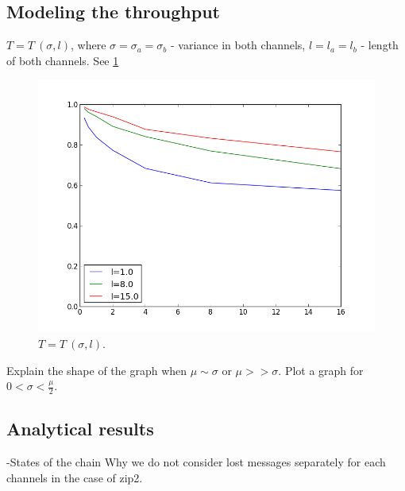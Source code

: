   \subsection{Modeling the throughput}
$T = T \: (\sigma, l)$, where $\sigma = \sigma_{a} = \sigma_{b}$ - variance in both channels, $l = l_{a} = l_{b}$ - length of both channels. See \ref{fig:t_s}
    \begin{figure}[here]
    \centering
    \includegraphics[scale=0.4]{figs/thr_(disp,l).png}
    \caption{$T = T \: (\sigma, l)$.}
    \label{fig:t_s}
    \end{figure}

Explain the shape of the graph when $\mu \sim \sigma$ or $\mu >> \sigma$.
Plot a graph for $0 < \sigma < \frac{\mu}{2}$.

  \subsection{Analytical results}
-States of the chain
Why we do not consider lost messages separately for each channels in the case of zip2. 

